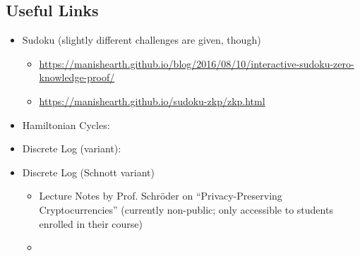 \documentclass[border=1cm,varwidth=38cm]{standalone}
\begin{document}
\subsection*{Useful Links}
\begin{itemize}
	\item Sudoku (slightly different challenges are given, though)\begin{itemize}
		\item \url{https://manishearth.github.io/blog/2016/08/10/interactive-sudoku-zero-knowledge-proof/}
		\item \url{https://manishearth.github.io/sudoku-zkp/zkp.html}
	\end{itemize}
	\item Hamiltonian Cycles: \cite{wiki:zero-knowledge-proofs-hamiltonian-graphs}
	\item Discrete Log (variant): \cite{wiki:zero-knowledge-proofs-discrete-log}
	\item Discrete Log (Schnott variant)\begin{itemize}
		\item Lecture Notes by Prof. Schröder on \enquote{Privacy-Preserving Cryptocurrencies} (currently non-public; only accessible to students enrolled in their course)
		\item \cite{SchnorrZeroKnowledge}
	\end{itemize}
\end{itemize}

\printbibliography[heading=subbibliography]
\end{document}

